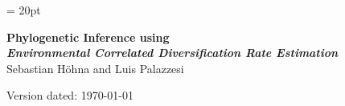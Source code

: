 \documentclass[11pt]{article}
\begin{document}
\renewcommand{\headrulewidth}{0.5pt}
\headsep = 20pt
\lhead{ }

\thispagestyle{plain}
\begin{center}

\textbf{\LARGE Phylogenetic Inference using \RevBayes}\\\vspace{2mm}
\textbf{\it{\Large Environmental Correlated Diversification Rate Estimation}}\\\vspace{2mm}
\vspace{1cm}
{\Large Sebastian H{\"o}hna and Luis Palazzesi}
\vspace{1cm}
\end{center}

\def \ResourcePath {./}
\def \GlobalResourcePath {../}



Version dated: \today
\end{document}
